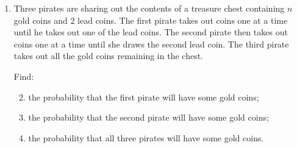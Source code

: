 \documentclass[a4, 11pt]{report}
\newlength{\qspace}
\newcounter{qnumber}
\newenvironment{question}%
 {\vspace{\qspace}
  \begin{enumerate}[\bfseries 1\quad][10]%
    \setcounter{enumi}{\value{qnumber}}%
    \item%
 }
{
  \end{enumerate}
  \filbreak
  \stepcounter{qnumber}
 }
\newenvironment{questionparts}[1][1]%
 {
  \begin{enumerate}[\bfseries (i)]%
    \setcounter{enumii}{#1}
    \addtocounter{enumii}{-1}
    \setlength{\itemsep}{5mm}
    \setlength{\parskip}{8pt}
 }
 {
  \end{enumerate}
 }
\begin{document}
\begin{question}
Three pirates are sharing out the contents of a treasure chest containing $n$ 
gold coins and $2$ lead coins. 
The first pirate takes out coins one at a time until 
he takes out one of the lead coins. 
The second pirate then takes out coins one at a time until she draws 
the second lead coin. 
The third pirate takes out all the gold coins remaining in the chest. 


Find:
\begin{questionparts}
\item the probability that the first pirate will have  some gold coins;
\item the probability that the  second pirate will have  some gold coins;
\item the probability that all three pirates will have some gold coins. 
\end{questionparts}
\end{question}
	
\end{document}
